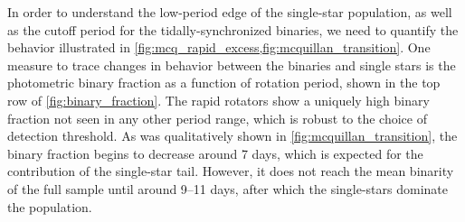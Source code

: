 \documentclass[manuscript]{aastex6}
\begin{document}
\begin{figure*}[htb]
    \centering
    \caption{\emph{Top Left:} The photometric binary fraction as a function of 
        period for the inclusive photometric binary threshold (\(\Delta K <
        -0.28\) mag). The photometric binary fraction
        for the full sample analyzed by \citet{McQuillan14} is shown as the
        dotted line. Error bars are 1-\(\sigma\) binomial confidence
        intervals. \emph{Top Right:} Same as the previous plot, except using
        the more conservative threshold (\(\Delta K < -0.41\) mag). \emph{Bottom
        left:} The period distribution of the photometric binary (solid green) 
        and photometric single (dashed purple) samples, each normalized by the 
        total number of photometric binaries and photometric single stars 
        analyzed by \citet{McQuillan14}, respectively, using the inclusive
        photometric binary threshold. Error bars are 1-\(\sigma\) Poisson 
        confidence intervals.\emph{Bottom Right:}
        Same as the previous plot, except with the more conservative vertical
        displacement threshold.}\label{fig:binary_fraction}
\end{figure*}

In order to understand the low-period edge of the single-star population, as
well as the cutoff period for the tidally-synchronized binaries, we need to
quantify the behavior illustrated in
\cref{fig:mcq_rapid_excess,fig:mcquillan_transition}. One measure to trace
changes in behavior between the binaries and single stars is the photometric
binary fraction as a function of rotation period, shown in the top row of 
\cref{fig:binary_fraction}. The rapid 
rotators show a uniquely high binary fraction not seen in any other period 
range, which is robust to the choice of detection threshold. As was 
qualitatively shown in \cref{fig:mcquillan_transition}, the binary fraction 
begins to decrease around 7 days, which is expected for the contribution of the
single-star tail. However, it does not reach the mean binarity of the full 
sample until around 9--11 days, after which the single-stars dominate the
population.
\end{document}
